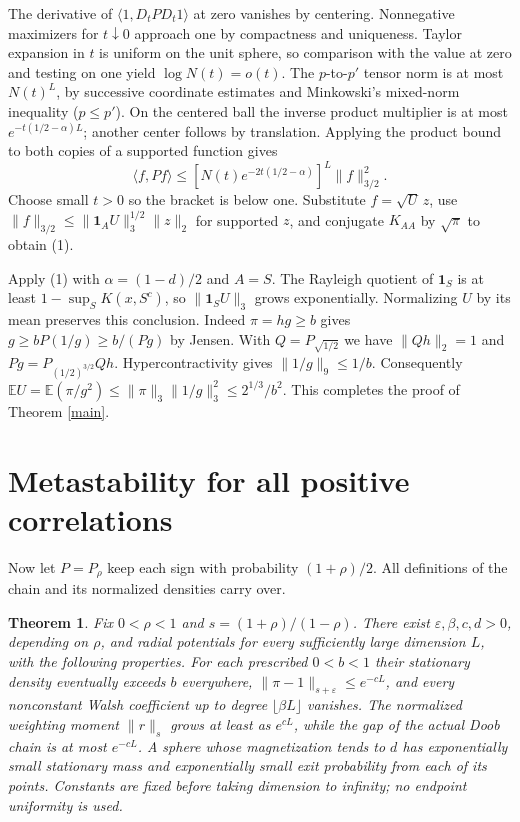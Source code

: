 \documentclass[11pt]{article}
\newtheorem{theorem}{Theorem}[section]
\newcommand{\E}{\mathbb E}
\newcommand{\one}{\mathbf 1}
\newcommand{\ip}[2]{\langle #1,#2\rangle}
\begin{document}
The derivative of $\ip{1}{D_t P D_t1}$ at zero vanishes by centering. Nonnegative maximizers for $t\downarrow0$ approach one by compactness and uniqueness. Taylor expansion in $t$ is uniform on the unit sphere, so comparison with the value at zero and testing on one yield $\log N(t)=o(t)$. The $p$-to-$p'$ tensor norm is at most $N(t)^L$, by successive coordinate estimates and Minkowski's mixed-norm inequality ($p\le p'$). On the centered ball the inverse product multiplier is at most $e^{-t(1/2-\alpha)L}$; another center follows by translation. Applying the product bound to both copies of a supported function gives
\[
 \ip{f}{P f}\le[N(t)e^{-2t(1/2-\alpha)}]^L\|f\|_{3/2}^2 .
\]
Choose small $t>0$ so the bracket is below one. Substitute $f=\sqrt U\,z$, use $\|f\|_{3/2}\le\|\one_A U\|_3^{1/2}\|z\|_2$ for supported $z$, and conjugate $K_{AA}$ by $\sqrt{\pi}$ to obtain (1).

Apply (1) with $\alpha=(1-d)/2$ and $A=S$. The Rayleigh quotient of $\one_S$ is at least $1-\sup_S K(x,S^c)$, so $\|\one_S U\|_3$ grows exponentially. Normalizing $U$ by its mean preserves this conclusion. Indeed $\pi=hg\ge b$ gives $g\ge b P(1/g)\ge b/(Pg)$ by Jensen. With $Q=P_{\sqrt{1/2}}$ we have $\|Qh\|_2=1$ and $Pg=P_{(1/2)^{3/2}}Qh$. Hypercontractivity gives $\|1/g\|_9\le1/b$. Consequently $\E U=\E(\pi/g^2)\le\|\pi\|_3\|1/g\|_3^2\le 2^{1/3}/b^2$. This completes the proof of Theorem \ref{main}.


\section{Metastability for all positive correlations}
Now let \(P=P_\rho\) keep each sign with probability \((1+\rho)/2\). All definitions of the chain and its normalized densities carry over.
\begin{theorem}\label{general}
Fix \(0<\rho<1\) and \(s=(1+\rho)/(1-\rho)\). There exist \(\varepsilon,\beta,c,d>0\), depending on \(\rho\), and radial potentials for every sufficiently large dimension \(L\), with the following properties. For each prescribed \(0<b<1\) their stationary density eventually exceeds \(b\) everywhere, \(\|\pi-1\|_{s+\varepsilon}\le e^{-cL}\), and every nonconstant Walsh coefficient up to degree \(\lfloor\beta L\rfloor\) vanishes. The normalized weighting moment \(\|r\|_s\) grows at least as \(e^{cL}\), while the gap of the actual Doob chain is at most \(e^{-cL}\). A sphere whose magnetization tends to \(d\) has exponentially small stationary mass and exponentially small exit probability from each of its points. Constants are fixed before taking dimension to infinity; no endpoint uniformity is used.
\end{theorem}
\end{document}
